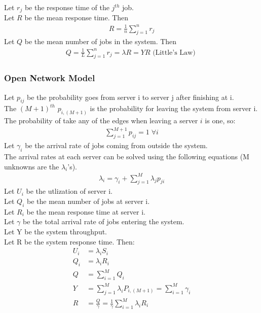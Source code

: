 Let $r_j$ be the response time of the $j^{th}$ job. \\
Let $R$ be the mean response time. Then
\begin{equation*} \begin{split}
	R = \frac{1}{n} \sum_{j=1}^n r_j
\end{split} \end{equation*}
Let $Q$ be the mean number of jobs in the system. Then
\begin{equation*} \begin{split}
	Q = \frac{1}{L} \sum_{j=1}^n r_j = \lambda R = Y R \mbox{ (Little's Law) }
\end{split} \end{equation*}

\subsubsection{Open Network Model}

Let $p_{ij}$ be the probability goes from server i to server j after finishing at i. \\
The $(M+1)^{th}$ $p_{i,(M+1)}$ is the probability for leaving the system from server i. \\
The probability of take any of the edges when leaving a server $i$ is one, so:
\begin{equation*} \begin{split}
	\sum_{j=1}^{M+1} p_{ij} = 1 \; \forall i
\end{split} \end{equation*}
Let $\gamma_i$ be the arrival rate of jobs coming from outside the system.\\
The arrival rates at each server can be solved using the following equations (M
unknowns are the $\lambda_i$'s).
\begin{equation*} \begin{split}
	\lambda_i = \gamma_i + \sum_{j=1}^M \lambda_j p_{ji}
\end{split} \end{equation*}
Let $U_i$ be the utlization of server i. \\
Let $Q_i$ be the mean number of jobs at server i. \\
Let $R_i$ be the mean response time at server i. \\
Let $\gamma$ be the total arrival rate of jobs entering the system. \\
Let Y be the system throughput. \\
Let R be the system response time. Then:
\begin{align*} 
	U_i &= \lambda_i S_i \\
	Q_i &= \lambda_i R_i \\
	Q   &= \sum_{i=1}^M Q_i \\
	Y   &= \sum_{j=1}^M \lambda_i P_{i,(M+1)} = \sum_{i=1}^M \gamma_i \\
	R   &= \frac{Q}{\gamma} = \frac{1}{\gamma} \sum_{i=1}^M \lambda_i R_i
\end{align*} 



